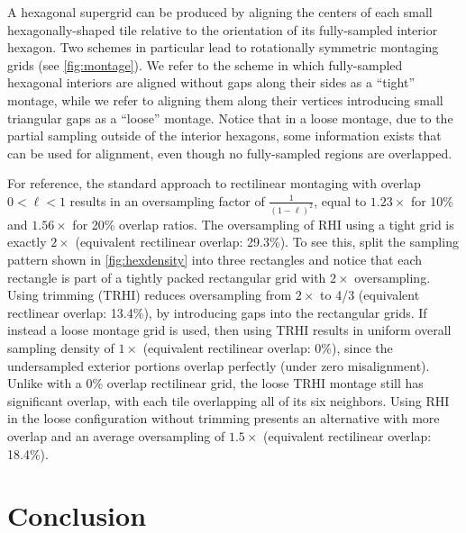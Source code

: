 \documentclass[aip, amsmath, amssymb, nobibnotes, nofootinbib, citeautoscript, reprint, superscriptaddress]{revtex4-1}
\begin{document}
    A hexagonal supergrid can be produced by aligning the centers of each small
    hexagonally-shaped tile relative to the orientation of its fully-sampled
    interior hexagon.
    Two schemes in particular lead to rotationally symmetric montaging grids (see \autoref{fig:montage}).
    We refer to the scheme in which fully-sampled hexagonal interiors are aligned
    without gaps along their sides as a ``tight'' montage, while we refer to
    aligning them along their vertices introducing small triangular gaps as a
    ``loose'' montage.
    Notice that in a loose montage, due to the partial sampling outside of the
    interior hexagons, some information exists that can be used for alignment, even
    though no fully-sampled regions are overlapped.



    For reference, the standard approach to rectilinear montaging with overlap
    $0<\ell<1$ results in an oversampling factor of $\frac{1}{(1-\ell)^2}$, equal to
    $1.23\times$ for 10\% and $1.56\times$ for 20\% overlap ratios.
    The oversampling of RHI using a tight grid is exactly $2\times$ (equivalent rectilinear
    overlap: 29.3\%).
    To see this, split the sampling pattern shown in \autoref{fig:hexdensity} into three
    rectangles and notice that each rectangle is part of a tightly packed
    rectangular grid with $2\times$ oversampling.
    Using trimming (TRHI) reduces oversampling from $2\times$ to 4/3 (equivalent rectlinear
    overlap: 13.4\%), by introducing gaps into the rectangular grids.
    If instead a loose montage grid is used, then using TRHI results in uniform
    overall sampling density of $1\times$ (equivalent rectilinear overlap: 0\%), since the
    undersampled exterior portions overlap perfectly (under zero misalignment).
    Unlike with a 0\% overlap rectilinear grid, the loose TRHI montage still has
    significant overlap, with each tile overlapping all of its six neighbors.
    Using RHI in the loose configuration without trimming presents an alternative
    with more overlap and an average oversampling of $1.5\times$ (equivalent rectilinear
    overlap: 18.4\%).


    \section{\label{sec:conclusion}Conclusion}
\end{document}
